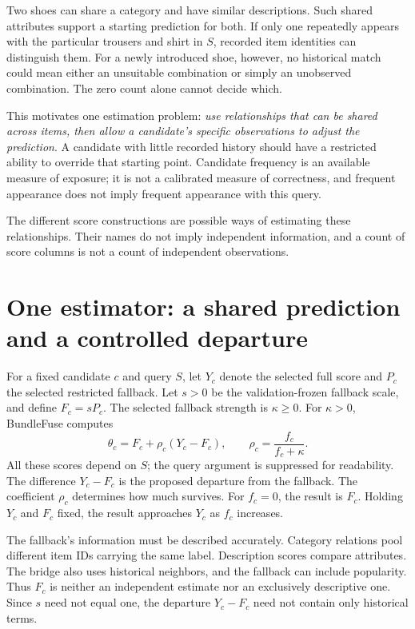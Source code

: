 \documentclass[11pt,a4paper]{article}
\begin{document}
Two shoes can share a category and have similar descriptions. Such shared
attributes support a starting prediction for both. If only one repeatedly
appears with the particular trousers and shirt in $S$, recorded item identities
can distinguish them. For a newly introduced shoe, however, no historical
match could mean either an unsuitable combination or simply an unobserved
combination. The zero count alone cannot decide which.

This motivates one estimation problem: \emph{use relationships that can be
shared across items, then allow a candidate's specific observations to adjust
the prediction}. A candidate with little recorded history should have a
restricted ability to override that starting point. Candidate frequency is an
available measure of exposure; it is not a calibrated measure of correctness,
and frequent appearance does not imply frequent appearance with this query.

The different score constructions are possible ways of estimating these
relationships. Their names do not imply independent information, and a count
of score columns is not a count of independent observations.

\newpage
\section{One estimator: a shared prediction and a controlled departure}
\label{sec:estimator}

For a fixed candidate $c$ and query $S$, let $Y_c$ denote the selected full
score and $P_c$ the selected restricted fallback. Let $s>0$ be the
validation-frozen fallback scale, and define $F_c=sP_c$. The selected
fallback strength is $\kappa\geq0$. For $\kappa>0$, BundleFuse computes
\begin{equation}
 \boxed{\quad
 \theta_c=F_c+\rho_c(Y_c-F_c),\qquad
 \rho_c=\frac{f_c}{f_c+\kappa}.
 \quad}
 \label{eq:core}
\end{equation}
All these scores depend on $S$; the query argument is suppressed for
readability. The difference $Y_c-F_c$ is the proposed departure from the
fallback. The coefficient $\rho_c$ determines how much survives.
For $f_c=0$, the result is $F_c$. Holding $Y_c$ and $F_c$ fixed, the result
approaches $Y_c$ as $f_c$ increases.

The fallback's information must be described accurately. Category relations
pool different item IDs carrying the same label. Description scores compare
attributes. The bridge also uses historical neighbors, and the fallback can
include popularity. Thus $F_c$ is neither an independent estimate nor an
exclusively descriptive one. Since $s$ need not equal one, the departure
$Y_c-F_c$ need not contain only historical terms.
\end{document}
